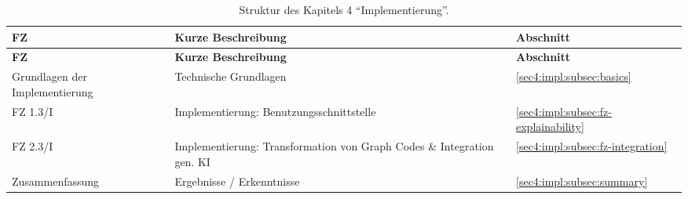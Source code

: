 {
    \def\arraystretch{1.1}%
    \begin{xltabular}{\linewidth}{
            @{}
            >{
                \linewidth
                \raggedright\arraybackslash
            }X
            >{
                \linewidth
                \raggedright\arraybackslash
            }X
            >{
                \linewidth
                \centering\arraybackslash
            }X
            @{}
    }


    \caption{Struktur des Kapitels 4 \enquote{Implementierung}.}
    \label{sec4:impl:table:structure} \\

    \toprule

    \textbf{FZ} & \textbf{Kurze Beschreibung} & \textbf{Abschnitt} \\

    \midrule

    \endfirsthead


    \toprule

    \textbf{FZ} & \textbf{Kurze Beschreibung} & \textbf{Abschnitt} \\

    \midrule

    \endhead


    Grundlagen der Implementierung & Technische Grundlagen & \cref{sec4:impl:subsec:basics} \\
    FZ 1.3/I & Implementierung: Benutzungsschnittstelle & \cref{sec4:impl:subsec:fz-explainability} \\
    FZ 2.3/I & Implementierung: Transformation von Graph Codes \& Integration gen. KI & \cref{sec4:impl:subsec:fz-integration} \\
    Zusammenfassung & Ergebnisse / Erkenntnisse & \cref{sec4:impl:subsec:summary} \\

    \bottomrule

    \end{xltabular}
}

